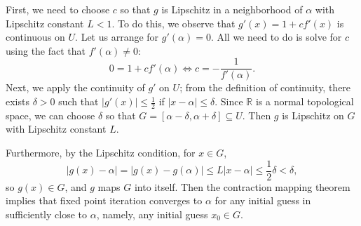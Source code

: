 \documentclass{homework}
\begin{document}
First, we need to choose $c$ so that $g$ is Lipschitz in a neighborhood of $\alpha$ with Lipschitz constant $L < 1$. To do this, we observe that $g'(x) = 1 + cf'(x)$ is continuous on $U$. Let us arrange for $g'(\alpha) = 0$. All we need to do is solve for $c$ using the fact that $f'(\alpha) \ne 0$:
\begin{equation*}
	0 = 1 + cf'(\alpha) \iff c = -\frac{1}{f'(\alpha)}.
\end{equation*}
Next, we apply the continuity of $g'$ on $U$; from the definition of continuity, there exists $\delta > 0$ such that $|g'(x)| \le \frac{1}{2}$ if $|x-\alpha| \le \delta$. Since $\mathbb{R}$ is a normal topological space, we can choose $\delta$ so that $G = [\alpha - \delta, \alpha + \delta] \subseteq U$. Then $g$ is Lipschitz on $G$ with Lipschitz constant $L$.

Furthermore, by the Lipschitz condition, for $x \in G$,
\begin{equation*}
	|g(x) - \alpha| = |g(x) - g(\alpha)| \le L|x-\alpha| \le \frac{1}{2}\delta < \delta,
\end{equation*}
so $g(x) \in G$, and $g$ maps $G$ into itself. Then the contraction mapping theorem implies that fixed point iteration converges to $\alpha$ for any initial guess in sufficiently close to $\alpha$, namely, any initial guess $x_0 \in G$.
\end{document}
